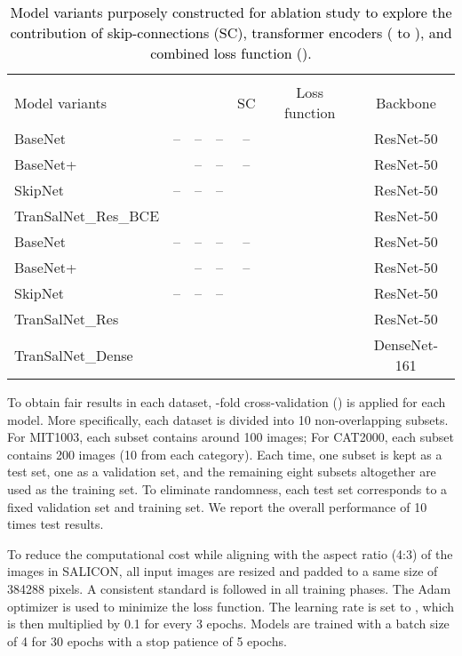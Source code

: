 \documentclass{article}
\begin{document}
\begin{table*}[]
\caption{\textcolor{black}{Model variants purposely constructed for ablation study to explore the contribution of skip-connections (SC),  transformer encoders ( to ), and combined loss function ().}}
\label{tb:variants}
\centering

\begin{tabular}{lcccccc}
\hline
& \multicolumn{6}{l}{} \\ \cline{2-7} 
Model variants &   &   &   & SC  & Loss function  & Backbone \\ \hline
BaseNet & --  &  -- &  -- &  -- &   & ResNet-50  \\

BaseNet+ &   & --  &  -- & --  &   & ResNet-50 \\

SkipNet & --  & --  & --  &   &   & ResNet-50 \\

TranSalNet\_Res\_BCE &   &   &   &   &   & ResNet-50 \\

BaseNet & --  &  -- &  -- & --  &   & ResNet-50 \\
BaseNet+ &   &  -- & --  & --  &   & ResNet-50 \\
SkipNet &--   &--   &--   &   &   & ResNet-50 \\

TranSalNet\_Res &   &   &   &  &   & ResNet-50 \\
TranSalNet\_Dense &   &   &   &   &   & DenseNet-161 \\ \hline
\end{tabular}

\end{table*}    


To obtain fair results in each dataset, -fold cross-validation () is applied for each model. More specifically, each dataset is divided into 10 non-overlapping subsets. For MIT1003, each subset contains around 100 images; For CAT2000, each subset contains 200 images (10 from each category). Each time, one subset is kept as a test set, one as a validation set, and the remaining eight subsets altogether are used as the training set. To eliminate randomness, each test set corresponds to a fixed validation set and training set. We report the overall performance of 10 times test results.

To reduce the computational cost while aligning with the aspect ratio (4:3) of the images in SALICON, all input images are resized and padded to a same size of 384288 pixels. 
A consistent standard is followed in all training phases. The Adam optimizer \cite{adam} is used to minimize the loss function. 
The learning rate is set to 
, 
which is then multiplied by 0.1 for every 3 epochs.
Models are trained with a batch size of 4 for 30 epochs with a stop patience of 5 epochs.
\end{document}
